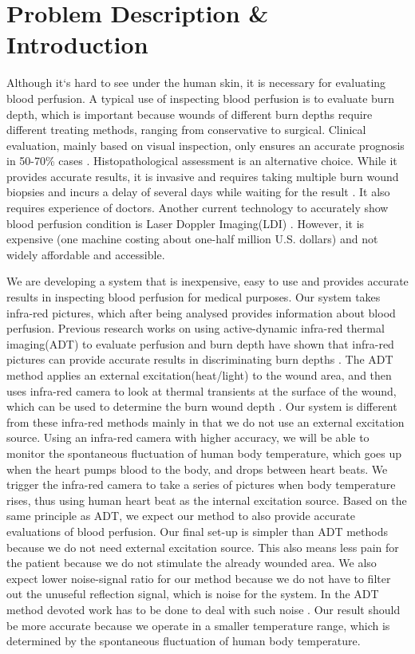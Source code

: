 \documentclass[paper=letter, fontsize=11pt]{scrartcl}
\numberwithin{equation}{section}		%
\numberwithin{figure}{section}			%
\numberwithin{table}{section}			%
\begin{document}
\section{Problem Description \& Introduction}

Although it`s hard to see under the human skin, it is necessary for evaluating blood perfusion.
A typical use of inspecting blood perfusion is to evaluate burn depth, which is important because wounds of different 
burn depths require different treating methods, ranging from conservative to surgical. Clinical evaluation,
mainly based on visual inspection, only ensures an accurate prognosis in 50-70\% cases \cite{Renkielska}. Histopathological
assessment is an alternative choice. While it provides accurate results, it is invasive and requires taking multiple
burn wound biopsies and incurs a delay of several days while waiting for the result \cite{Renkielska}. It also requires 
experience of doctors. Another current technology to accurately show
blood perfusion condition is Laser Doppler Imaging(LDI) \cite{Pape}. However, it is expensive (one machine costing
about one-half million U.S. dollars) and not widely affordable and accessible.

We are developing a system that is inexpensive, easy to use and provides accurate results in inspecting blood perfusion
for medical purposes. Our system takes infra-red pictures, which after being analysed provides information
about blood perfusion. Previous research works on using active-dynamic infra-red thermal imaging(ADT)
to evaluate perfusion and burn depth have shown that infra-red pictures can provide accurate results in
discriminating burn depths \cite{Renkielska}\cite{Ruminski}. The ADT method applies an external excitation(heat/light) to the wound area, and then uses
infra-red camera to look at thermal transients at the surface of the wound, which can be used to determine
the burn wound depth \cite{Renkielska}\cite{Ruminski}. Our system is different from these infra-red methods mainly in that
we do not use an external excitation source. Using an infra-red camera with higher accuracy, we will be able
to monitor the spontaneous fluctuation of human body temperature, which goes up when the heart pumps blood
to the body, and drops between heart beats. We trigger the infra-red camera to take a series of pictures
when body temperature rises, thus using human heart beat as the internal excitation source. Based on
the same principle as ADT, we expect our method to also provide accurate evaluations of blood perfusion. Our final
set-up is simpler than ADT methods because we do not need external excitation source. This also means less pain
for the patient because we do not stimulate the already wounded area. We also expect lower noise-signal ratio for
our method because we do not have to filter out the unuseful reflection signal, which is noise for the system. In
the ADT method devoted work has to be done to deal with such noise \cite{Ruminski}.
Our result should be more accurate because we operate in a smaller temperature range, which is determined by the
spontaneous fluctuation of human body temperature.
\end{document}
